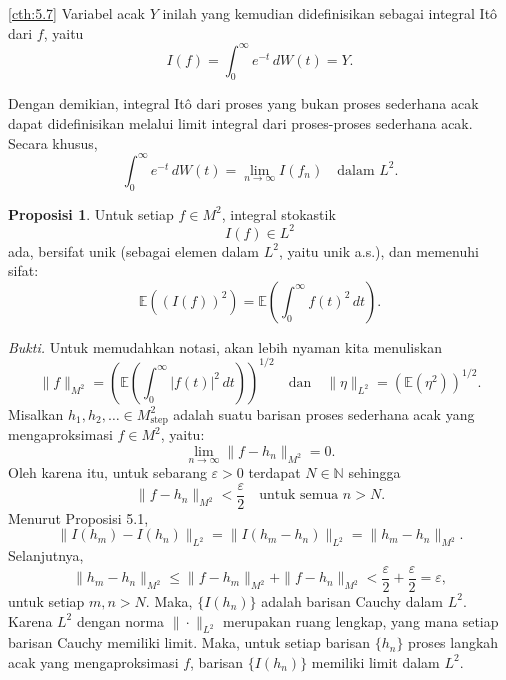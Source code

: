 \documentclass[aspectratio=169,11pt]{beamer}
\theoremstyle{definition}
\newtheorem{proposisi}{Proposisi}
\newcommand{\myref}[1]{\hyperref[#1]{\nameCref{#1} \ref*{#1}}}
\newcommand{\N}{\mathbb{N}}
\begin{document}
\begin{frame}{\insertsection}{\insertsubsection}
  \begin{exampleblock}{\myref{cth:5.7}}
    Variabel acak $Y$ inilah yang kemudian didefinisikan sebagai integral Itô dari
    $f$, yaitu
    \[
      I(f)
      =
      \int_0^\infty e^{-t}\,dW(t)
      =
      Y.
    \]

    Dengan demikian, integral Itô dari proses yang bukan proses sederhana acak dapat
    didefinisikan melalui limit integral dari proses-proses sederhana acak. Secara
    khusus,
    \[
      \int_0^\infty e^{-t}\,dW(t)
      =
      \lim_{n\to\infty} I(f_n)
      \quad \text{dalam } L^2.
    \]
  \end{exampleblock}
\end{frame}

\begin{frame}[allowframebreaks]{\insertsection}{\insertsubsection}
  \begin{proposisi}
    Untuk setiap $f \in M^2$, integral stokastik
    \begin{equation*}
      I(f) \in L^2
    \end{equation*}
    ada, bersifat unik (sebagai elemen dalam $L^2$, yaitu unik a.s.), dan memenuhi sifat:
    \begin{equation*}
      \mathbb{E}((I(f))^2) = \mathbb{E}\left(\int_0^\infty f(t)^2 \, dt\right).
    \end{equation*}
  \end{proposisi}
  \textit{Bukti.} Untuk memudahkan notasi, akan lebih nyaman kita menuliskan
  \begin{equation*}
    \|f\|_{M^2} = \left(\mathbb{E}\left(\int_0^\infty |f(t)|^2 \, dt\right)\right)^{1/2} \quad \text{dan} \quad \|\eta\|_{L^2} = (\mathbb{E}(\eta^2))^{1/2}.
  \end{equation*}
  Misalkan $h_1, h_2, \dots \in M_{\text{step}}^2$ adalah suatu barisan proses sederhana acak yang mengaproksimasi $f \in M^2$, yaitu:
  \begin{equation*}
    \lim_{n \to \infty} \|f - h_n\|_{M^2} = 0.
  \end{equation*}
  Oleh karena itu, untuk sebarang $\varepsilon > 0$ terdapat $N \in \N$ sehingga
  \begin{equation*}
    \|f - h_n\|_{M^2} < \frac{\varepsilon}{2} \quad \text{untuk semua } n > N.
  \end{equation*}
  Menurut Proposisi 5.1,
  \begin{equation*}
    \|I(h_m) - I(h_n)\|_{L^2} = \|I(h_m - h_n)\|_{L^2} = \|h_m - h_n\|_{M^2}.
  \end{equation*}
  Selanjutnya,
  \begin{equation*}
    \|h_m - h_n\|_{M^2} \leq \|f - h_m\|_{M^2} + \|f - h_n\|_{M^2} < \frac{\varepsilon}{2} + \frac{\varepsilon}{2} = \varepsilon,
  \end{equation*}
  untuk setiap $m, n > N$. Maka, $\{I(h_n)\}$ adalah barisan Cauchy dalam $L^2$. Karena $L^2$ dengan norma $\|\cdot\|_{L^2}$ merupakan ruang lengkap, yang mana setiap barisan Cauchy memiliki limit. Maka, untuk setiap barisan $\{h_n\}$ proses langkah acak yang mengaproksimasi $f$, barisan $\{I(h_n)\}$ memiliki limit dalam $L^2$.


\end{frame}
\end{document}
